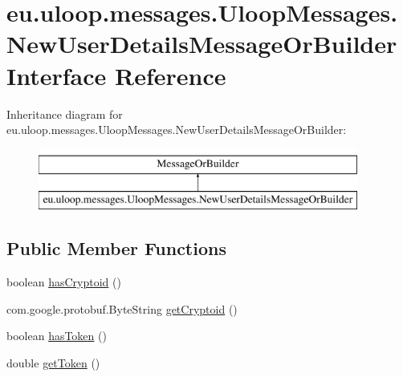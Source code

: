 \hypertarget{interfaceeu_1_1uloop_1_1messages_1_1UloopMessages_1_1NewUserDetailsMessageOrBuilder}{\section{eu.\+uloop.\+messages.\+Uloop\+Messages.\+New\+User\+Details\+Message\+Or\+Builder Interface Reference}
\label{interfaceeu_1_1uloop_1_1messages_1_1UloopMessages_1_1NewUserDetailsMessageOrBuilder}
}
Inheritance diagram for eu.\+uloop.\+messages.\+Uloop\+Messages.\+New\+User\+Details\+Message\+Or\+Builder\+:\begin{figure}[H]
\begin{center}
\leavevmode
\includegraphics[height=2.000000cm]{interfaceeu_1_1uloop_1_1messages_1_1UloopMessages_1_1NewUserDetailsMessageOrBuilder}
\end{center}
\end{figure}
\subsection*{Public Member Functions}
\begin{DoxyCompactItemize}
\item 
boolean \hyperlink{interfaceeu_1_1uloop_1_1messages_1_1UloopMessages_1_1NewUserDetailsMessageOrBuilder_a9fcf0b3404d306058652c2531c20ff76}{has\+Cryptoid} ()
\item 
com.\+google.\+protobuf.\+Byte\+String \hyperlink{interfaceeu_1_1uloop_1_1messages_1_1UloopMessages_1_1NewUserDetailsMessageOrBuilder_a395174043045e6c69d20c473d5e0218b}{get\+Cryptoid} ()
\item 
boolean \hyperlink{interfaceeu_1_1uloop_1_1messages_1_1UloopMessages_1_1NewUserDetailsMessageOrBuilder_a93e9d6e417c4971a2ce7b6d246f0fcb2}{has\+Token} ()
\item 
double \hyperlink{interfaceeu_1_1uloop_1_1messages_1_1UloopMessages_1_1NewUserDetailsMessageOrBuilder_a3cbd6ee88ca68476373a457d35b743a7}{get\+Token} ()
\end{DoxyCompactItemize}


